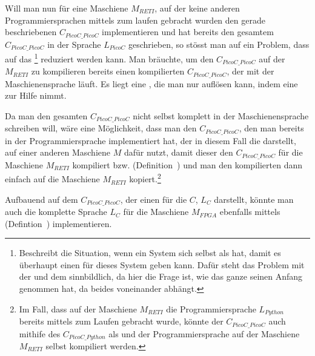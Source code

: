 Will man nun für eine Maschiene $M_{RETI}$, auf der keine anderen Programmiersprachen mittels  zum laufen gebracht wurden den gerade beschriebenen  $C_{PicoC\_PicoC}$ implementieren und hat bereits den gesamtem  $C_{PicoC\_PicoC}$ in der Sprache  $L_{PicoC}$ geschrieben, so stösst man auf ein Problem, dass auf das \footnote{Beschreibt die Situation, wenn ein System sich selbst als  hat, damit es überhaupt einen  für dieses System geben kann. Dafür steht das Problem mit der  und dem  sinnbildlich, da hier die Frage ist, wie das ganze seinen Anfang genommen hat, da beides  voneinander abhängt.} reduziert werden kann. Man bräuchte, um den  $C_{PicoC\_PicoC}$ auf der  $M_{RETI}$ zu kompilieren bereits einen kompilierten  $C_{PicoC\_PicoC}$, der mit der Maschienensprache  läuft. Es liegt eine , die man nur auflösen kann, indem eine  zur Hilfe nimmt.

Da man den gesamten  $C_{PicoC\_PicoC}$ nicht selbst komplett in der Maschienensprache  schreiben will, wäre eine Möglichkeit, dass man den  $C_{PicoC\_PicoC}$, den man bereits in der Programmiersprache  implementiert hat, der in diesem Fall die  darstellt, auf einer anderen Maschiene $M$ dafür nutzt, damit dieser den  $C_{PicoC\_PicoC}$ für die Maschiene $M_{RETI}$ kompiliert bzw.  (Definition~) und man den kompilierten  dann einfach auf die Maschiene $M_{RETI}$ kopiert.\footnote{Im Fall, dass auf der Maschiene $M_{RETI}$ die Programmiersprache $L_{Python}$ bereits mittels  zum Laufen gebracht wurde, könnte der  $C_{PicoC\_PicoC}$ auch mithife des  $C_{PicoC\_Python}$ als  und der Programmiersprache  auf der Maschiene $M_{RETI}$ selbst kompiliert werden.}

Aufbauend auf dem  $C_{PicoC\_PicoC}$, der einen  für die  $C$, $L_C$ darstellt, könnte man auch die komplette Sprache $L_C$ für die Maschiene $M_{FPGA}$ ebenfalls mittels  (Defintion~) implementieren.

